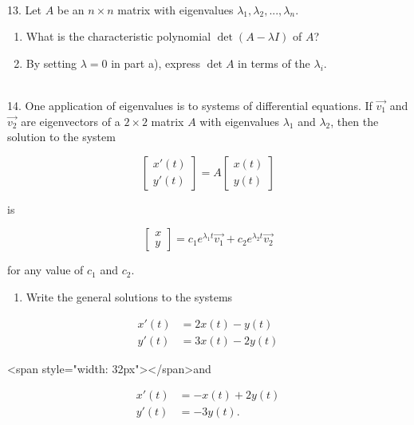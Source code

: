 \documentclass{article}
\begin{document}
~\\

13. Let $A$ be an $n \times n$ matrix with eigenvalues $\lambda_1, \lambda_2, ..., \lambda_n$.

\begin{enumerate}

	\item What is the characteristic polynomial $\det(A - \lambda I)$ of $A$?

	\item By setting $\lambda = 0$ in part a), express $\det A$ in terms of the $\lambda_i$.

\end{enumerate}

~\\

14. One application of eigenvalues is to systems of differential equations. If $\vec{v_1}$ and $\vec{v_2}$ are eigenvectors of a $2 \times 2$ matrix $A$ with eigenvalues $\lambda_1$ and $\lambda_2$, then the solution to the system

$$
	\left[\begin{array}{c} x'(t) \\ y'(t) \end{array}\right] = A\left[\begin{array}{c} x(t) \\ y(t) \end{array}\right]
$$

is

$$
	\left[\begin{array}{c} x \\ y \end{array}\right] = c_1 e^{\lambda_1 t} \vec{v_1} + c_2 e^{\lambda_2 t} \vec{v_2}
$$

for any value of $c_1$ and $c_2$.

\begin{enumerate}

	\item Write the general solutions to the systems

\end{enumerate}

\begin{align*}
	x'(t) &= 2x(t) - y(t)\\
	y'(t) &= 3x(t) - 2y(t)
\end{align*}

<span style="width: 32px"></span>and

\begin{align*}
	x'(t) &= -x(t) + 2y(t)\\
	y'(t) &= -3y(t).
\end{align*}
\end{document}
